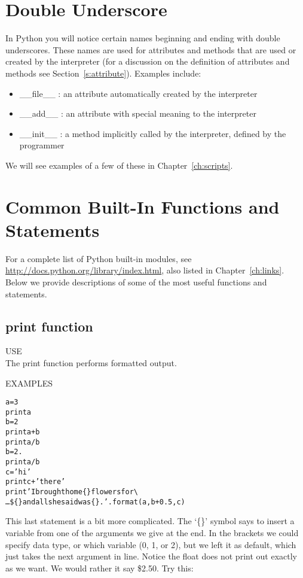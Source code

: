 \section{Double Underscore}
In Python you will notice certain names beginning and ending with
double underscores.  These names are used for attributes and methods
that are used or created by the interpreter (for a discussion on the
definition of attributes and methods see Section~\ref{s:attribute}).
Examples include:
\begin{itemize}
\item  \_\_file\_\_ :  an attribute automatically created by the interpreter
\item  \_\_add\_\_ : an attribute with special meaning to the interpreter
\item  \_\_init\_\_ : a method implicitly called by the interpreter,
  defined by the programmer
\end{itemize}
We will see examples of a few of these in Chapter~\ref{ch:scripts}.

\section{Common Built-In Functions and Statements}
For a complete list of Python built-in modules, see
\url{http://docs.python.org/library/index.html}, also listed in
Chapter~\ref{ch:links}.  Below we provide descriptions of some of the
most useful functions and statements.

\subsection{ {\sf print } function}
{\color{blue} {\sf\small USE}} \\
The  {\sf\small print} function performs formatted output. 

{\color{blue} {\sf\small EXAMPLES}} 
\begin{alltt}
\pytab a = 3 
\pytab print a 
\pytab b = 2 
\pytab print a + b
\pytab print a / b
\pytab b = 2. 
\pytab print a / b
\pytab c = 'hi' 
\pytab print c + ' there' 
\pytab print 'I brought home \{\} flowers for \textbackslash 
\ldots    \$\{\} and all she said was \{\}.'.format(a,b+0.5,c)
\end{alltt}
This last statement is a bit more complicated.  The `\{\}' symbol says
to insert a variable from one of the arguments we give at the end.  In
the brackets we could specify data type, or which variable (0, 1, or
2), but we left it as default, which just takes the next argument in
line.  Notice the float does not print out exactly as we want.  We
would rather it say \$2.50.  Try this:

